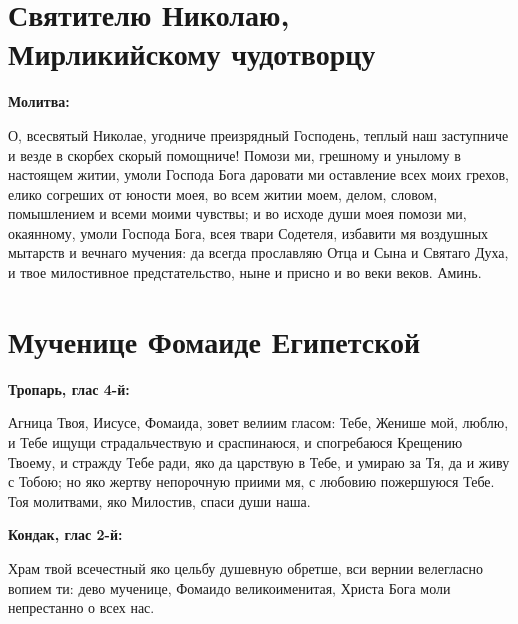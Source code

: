  



\vspace{-\baselineskip}\section{Святителю Николаю, Мирликийскому чудотворцу}
 
\bfseries Молитва:\normalfont{}\nopagebreak


О, всесвятый Николае, угодниче преизрядный Господень, теплый наш заступниче и везде в скорбех скорый помощниче! Помози ми, грешному и унылому в настоящем житии, умоли Господа Бога даровати ми оставление всех моих грехов, елико согреших от юности моея, во всем житии моем, делом, словом, помышлением и всеми моими чувствы; и во исходе души моея помози ми, окаянному, умоли Господа Бога, всея твари Содетеля, избавити мя воздушных мытарств и вечнаго мучения: да всегда прославляю Отца и Сына и Святаго Духа, и твое милостивное предстательство, ныне и присно и во веки веков. Аминь. 
\longpage[3]{}\mychapterending


 

\section{Мученице Фомаиде Египетской}
 
\bfseries Тропарь, глас 4-й:\normalfont{}\nopagebreak

 Агница Твоя, Иисусе, Фомаида, зовет велиим гласом: Тебе, Женише мой, люблю, и Тебе ищущи страдальчествую и сраспинаюся, и спогребаюся Крещению Твоему, и стражду Тебе ради, яко да царствую в Тебе, и умираю за Тя, да и живу с Тобою; но яко жертву непорочную приими мя, с любовию пожершуюся Тебе. Тоя молитвами, яко Милостив, спаси души наша.





\bfseries Кондак, глас 2-й:\normalfont{}\nopagebreak

 Храм твой всечестный яко цельбу душевную обретше, вси вернии велегласно вопием ти: дево мученице, Фомаидо великоименитая, Христа Бога моли непрестанно о всех нас.





